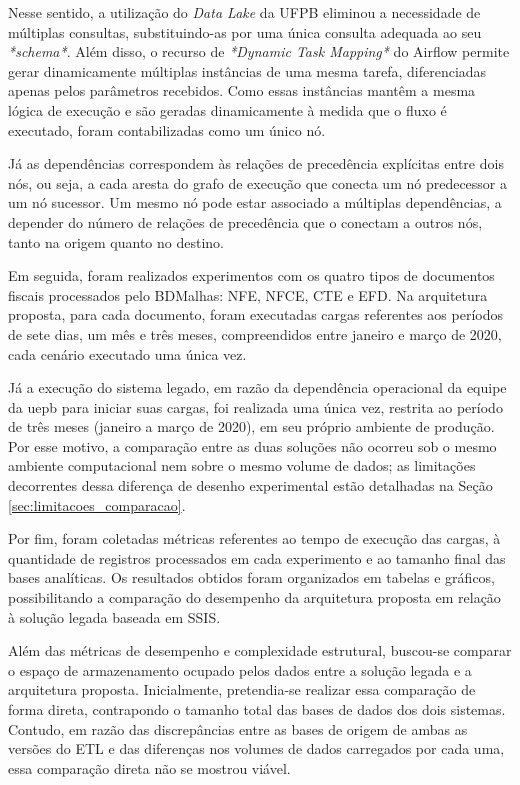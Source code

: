 Nesse sentido, a utilização do \textit{Data Lake} da UFPB eliminou a necessidade de múltiplas consultas, 
substituindo-as por uma única consulta adequada ao seu \textit{*schema*}. Além disso, o recurso de 
\textit{*Dynamic Task Mapping*} do Airflow permite gerar dinamicamente múltiplas instâncias de uma mesma 
tarefa, diferenciadas apenas pelos parâmetros recebidos. Como essas instâncias mantêm a mesma lógica de 
execução e são geradas dinamicamente à medida que o fluxo é executado, foram contabilizadas como um único nó.

Já as dependências correspondem às relações de precedência explícitas entre dois nós, ou seja, a cada
aresta do grafo de execução que conecta um nó predecessor a um nó sucessor. Um mesmo nó pode estar
associado a múltiplas dependências, a depender do número de relações de precedência que o conectam a
outros nós, tanto na origem quanto no destino.

Em seguida, foram realizados experimentos com os quatro tipos de documentos
fiscais processados pelo BDMalhas: NFE, NFCE, CTE e EFD. Na arquitetura proposta, para cada
documento, foram executadas cargas referentes aos períodos de sete dias, um mês e três meses,
compreendidos entre janeiro e março de 2020, cada cenário executado uma única vez.

Já a execução do sistema legado, em razão da dependência operacional da equipe da \gls{uepb}
para iniciar suas cargas, foi realizada uma única vez,
restrita ao período de três meses (janeiro a março de 2020), em seu próprio ambiente de produção.
Por esse motivo, a comparação entre as duas soluções não ocorreu sob o mesmo ambiente computacional
nem sobre o mesmo volume de dados; as limitações decorrentes dessa diferença de desenho experimental
estão detalhadas na Seção \ref{sec:limitacoes_comparacao}.

Por fim, foram coletadas métricas referentes ao tempo de execução das cargas, à quantidade de
registros processados em cada experimento e ao tamanho final das bases analíticas. Os resultados
obtidos foram organizados em tabelas e gráficos, possibilitando a comparação do desempenho da
arquitetura proposta em relação à solução legada baseada em SSIS.

Além das métricas de desempenho e complexidade estrutural, buscou-se comparar o espaço de
armazenamento ocupado pelos dados entre a solução legada e a arquitetura proposta. Inicialmente,
pretendia-se realizar essa comparação de forma direta, contrapondo o tamanho total das bases de
dados dos dois sistemas. Contudo, em razão das discrepâncias entre as bases de origem de ambas as
versões do ETL e das diferenças nos volumes de dados carregados por cada uma, essa comparação
direta não se mostrou viável.

